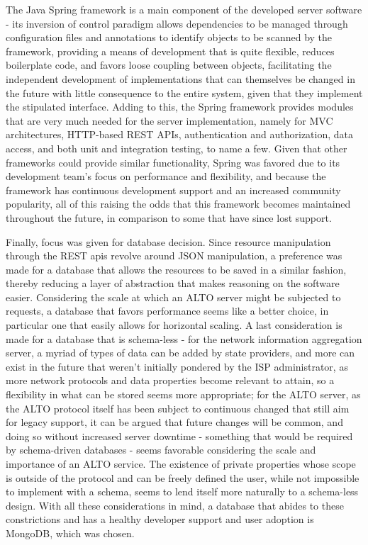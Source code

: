     The Java Spring framework is a main component of the developed server software - its inversion of control paradigm allows dependencies to be managed through configuration files and annotations to identify objects to be scanned by the framework, providing a means of development that is quite flexible, reduces boilerplate code, and favors loose coupling between objects, facilitating the independent development of implementations that can themselves be changed in the future with little consequence to the entire system, given that they implement the stipulated interface.
    Adding to this, the Spring framework provides modules that are very much needed for the server implementation, namely for MVC architectures, HTTP-based REST APIs, authentication and authorization, data access, and both unit and integration testing, to name a few.
    Given that other frameworks could provide similar functionality, Spring was favored due to its development team's focus on performance and flexibility, and because the framework has continuous development support and an increased community popularity, all of this raising the odds that this framework becomes maintained throughout the future, in comparison to some that have since lost support.

    Finally, focus was given for database decision.
    Since resource manipulation through the REST apis revolve around JSON manipulation, a preference was made for a database that allows the resources to be saved in a similar fashion, thereby reducing a layer of abstraction that makes reasoning on the software easier.
    Considering the scale at which an ALTO server might be subjected to requests, a database that favors performance seems like a better choice, in particular one that easily allows for horizontal scaling.
    A last consideration is made for a database that is schema-less - for the network information aggregation server, a myriad of types of data can be added by state providers, and more can exist in the future that weren't initially pondered by the ISP administrator, as more network protocols and data properties become relevant to attain, so a flexibility in what can be stored seems more appropriate; for the ALTO server, as the ALTO protocol itself has been subject to continuous changed that still aim for legacy support, it can be argued that future changes will be common, and doing so without increased server downtime - something that would be required by schema-driven databases - seems favorable considering the scale and importance of an ALTO service.
    The existence of private properties whose scope is outside of the protocol and can be freely defined the user, while not impossible to implement with a schema, seems to lend itself more naturally to a schema-less design.
    With all these considerations in mind, a database that abides to these constrictions and has a healthy developer support and user adoption is MongoDB, which was chosen.

